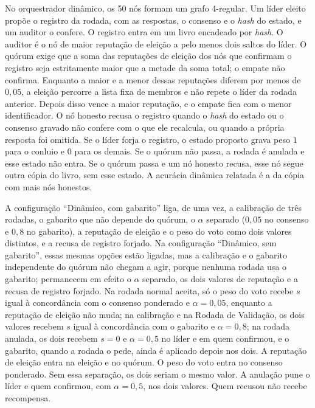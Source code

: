 \documentclass[12pt]{article}
\begin{document}
No orquestrador dinâmico, os 50 nós formam um grafo 4-regular. Um líder eleito propõe o registro da rodada, com as respostas, o consenso e o \textit{hash} do estado, e um auditor o confere. O registro entra em um livro encadeado por \textit{hash}. O auditor é o nó de maior reputação de eleição a pelo menos dois saltos do líder. O quórum exige que a soma das reputações de eleição dos nós que confirmam o registro seja estritamente maior que a metade da soma total; o empate não confirma. Enquanto a maior e a menor dessas reputações diferem por menos de $0{,}05$, a eleição percorre a lista fixa de membros e não repete o líder da rodada anterior. Depois disso vence a maior reputação, e o empate fica com o menor identificador. O nó honesto recusa o registro quando o \textit{hash} do estado ou o consenso gravado não confere com o que ele recalcula, ou quando a própria resposta foi omitida. Se o líder forja o registro, o estado proposto grava peso $1$ para o conluio e $0$ para os demais. Se o quórum não passa, a rodada é anulada e esse estado não entra. Se o quórum passa e um nó honesto recusa, esse nó segue outra cópia do livro, sem esse estado. A acurácia dinâmica relatada é a da cópia com mais nós honestos.

A configuração ``Dinâmico, com gabarito'' liga, de uma vez, a calibração de três rodadas, o gabarito que não depende do quórum, o $\alpha$ separado ($0{,}05$ no consenso e $0{,}8$ no gabarito), a reputação de eleição e o peso do voto como dois valores distintos, e a recusa de registro forjado. Na configuração ``Dinâmico, sem gabarito'', essas mesmas opções estão ligadas, mas a calibração e o gabarito independente do quórum não chegam a agir, porque nenhuma rodada usa o gabarito; permanecem em efeito o $\alpha$ separado, os dois valores de reputação e a recusa de registro forjado. Na rodada normal aceita, só o peso do voto recebe $s$ igual à concordância com o consenso ponderado e $\alpha = 0{,}05$, enquanto a reputação de eleição não muda; na calibração e na Rodada de Validação, os dois valores recebem $s$ igual à concordância com o gabarito e $\alpha = 0{,}8$; na rodada anulada, os dois recebem $s = 0$ e $\alpha = 0{,}5$ no líder e em quem confirmou, e o gabarito, quando a rodada o pede, ainda é aplicado depois nos dois. A reputação de eleição entra na eleição e no quórum. O peso do voto entra no consenso ponderado. Sem essa separação, os dois seriam o mesmo valor. A anulação pune o líder e quem confirmou, com $\alpha = 0{,}5$, nos dois valores. Quem recusou não recebe recompensa.
\end{document}
